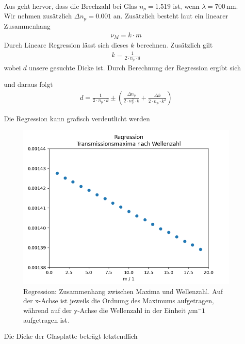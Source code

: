 \documentclass{article}
\begin{document}
Aus \cite{moodle} geht hervor, dass die Brechzahl bei Glas $n_p = 1.519$ ist, wenn $\lambda=700~$nm. Wir nehmen zusätzlich $\Delta n_p = 0.001$ an.
Zusätzlich besteht laut \cite{moodle} ein linearer Zusammenhang 
\begin{align*}
\nu_M = k\cdot m
\end{align*}
Durch Lineare Regression lässt sich dieses $k$ berechnen. Zusätzlich gilt
\begin{align*}
k = \frac{1}{2\cdot n_p\cdot d}
\end{align*}
wobei $d$ unsere gesuchte Dicke ist. Durch Berechnung der Regression ergibt sich

und daraus folgt
\begin{align*}
d = \frac{1}{2\cdot n_p\cdot k} \pm \left( \frac{\Delta n_p}{2\cdot n_p^2\cdot k} + \frac{\Delta k}{2\cdot n_p\cdot k^2}\right)
\end{align*}


Die Regression kann grafisch verdeutlicht werden
\begin{figure}[H]
\centering
\caption{Regression: Zusammenhang zwischen Maxima und Wellenzahl. Auf der x-Achse ist jeweils die Ordnung des Maximums aufgetragen, während auf der y-Achse die Wellenzahl in der Einheit $\mu$m$^-1$ aufgetragen ist.}
\includegraphics[scale=.5]{GP1_scatterplot_2.png}
\end{figure}


Die Dicke der Glasplatte beträgt letztendlich

\end{document}
